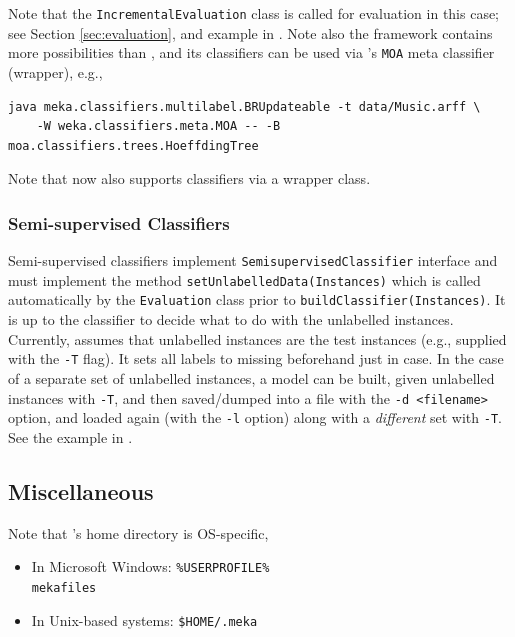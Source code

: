 \documentclass[11pt]{article}
\newcommand{\MEKA}{Meka}
\newcommand{\MOA}{Moa}
\newcommand{\WEKA}{Weka}
\begin{document}
Note that the \texttt{IncrementalEvaluation} class is called for evaluation in this case; see Section \ref{sec:evaluation}, and example in . Note also the \framework{\MOA} framework \cite{MOA} contains more possibilities than \framework{\WEKA}, and its classifiers can be used via 's \texttt{MOA} meta classifier (wrapper), e.g., 
\begin{lstlisting}
java meka.classifiers.multilabel.BRUpdateable -t data/Music.arff \
	-W weka.classifiers.meta.MOA -- -B moa.classifiers.trees.HoeffdingTree
\end{lstlisting}

Note that \framework{\MOA} now also supports \framework{\MEKA} classifiers via a wrapper class.

\subsubsection{Semi-supervised Classifiers}

Semi-supervised classifiers implement \texttt{SemisupervisedClassifier} interface and must implement the method \texttt{setUnlabelledData(Instances)} which is called automatically by the \texttt{Evaluation} class prior to \texttt{buildClassifier(Instances)}. It is up to the classifier to decide what to do with the unlabelled instances. Currently, \framework{\MEKA} assumes that unlabelled instances are the test instances (e.g., supplied with the \texttt{-T} flag). It sets all labels to missing beforehand just in case. In the case of a separate set of unlabelled instances, a model can be built, given unlabelled instances with \texttt{-T}, and then saved/dumped into a file with the \texttt{-d <filename>} option, and loaded again (with the \texttt{-l} option) along with a \emph{different} set with \texttt{-T}.  See the example in .

\subsection{Miscellaneous}

Note that \framework{\MEKA}'s home directory is OS-specific,

\begin{itemize}
	\item In Microsoft Windows: \texttt{\%USERPROFILE\%\\mekafiles}
	\item In Unix-based systems: \texttt{\$HOME/.meka}
\end{itemize}
\end{document}
